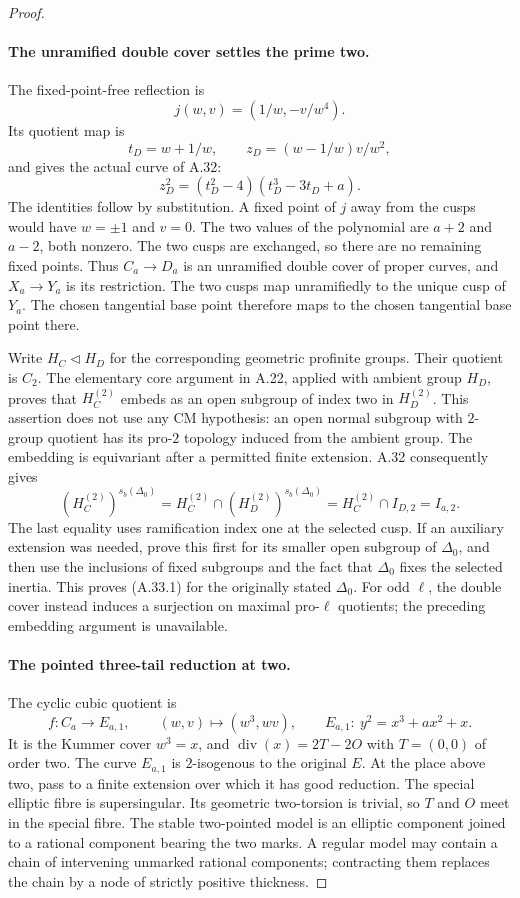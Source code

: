 \begin{proof}
\paragraph{The unramified double cover settles the prime two.}
The fixed-point-free reflection is
\[
 j(w,v)=(1/w,-v/w^4).
\]
Its quotient map is
\[
 t_D=w+1/w,\qquad
 z_D=(w-1/w)v/w^2,
\]
and gives the actual curve of A.32:
\[
 z_D^2=(t_D^2-4)(t_D^3-3t_D+a).
\]
The identities follow by substitution. A fixed point
of $j$ away from the cusps would have $w=\pm1$ and
$v=0$. The two values of the polynomial are $a+2$
and $a-2$, both nonzero. The two cusps are exchanged,
so there are no remaining fixed points. Thus
$C_a\to D_a$ is an unramified double cover of proper
curves, and $X_a\to Y_a$ is its restriction.
The two cusps map unramifiedly to the unique cusp
of $Y_a$. The chosen tangential base point therefore
maps to the chosen tangential base point there.

Write $H_C\triangleleft H_D$ for the corresponding
geometric profinite groups. Their quotient is $C_2$.
The elementary core argument in A.22, applied with
ambient group $H_D$, proves that $H_C^{(2)}$ embeds
as an open subgroup of index two in $H_D^{(2)}$.
This assertion does not use any CM hypothesis:
an open normal subgroup with $2$-group quotient has
its pro-$2$ topology induced from the ambient group.
The embedding is equivariant after a permitted
finite extension. A.32 consequently gives
\[
 (H_C^{(2)})^{s_b(\Delta_0)}
       =H_C^{(2)}\cap (H_D^{(2)})^{s_b(\Delta_0)}
       =H_C^{(2)}\cap I_{D,2}=I_{a,2}.
\]
The last equality uses ramification index one at
the selected cusp. If an auxiliary extension was
needed, prove this first for its smaller open
subgroup of $\Delta_0$, and then use the inclusions
of fixed subgroups and the fact that $\Delta_0$
fixes the selected inertia. This proves (A.33.1)
for the originally stated $\Delta_0$.
For odd $\ell$, the double cover instead induces
a surjection on maximal pro-$\ell$ quotients;
the preceding embedding argument is unavailable.

\paragraph{The pointed three-tail reduction at two.}
The cyclic cubic quotient is
\[
 f:C_a\longrightarrow E_{a,1},\qquad
          (w,v)\longmapsto(w^3,wv),
 \qquad E_{a,1}:\ y^2=x^3+ax^2+x.
\]
It is the Kummer cover $w^3=x$, and
$\operatorname{div}(x)=2T-2O$ with $T=(0,0)$
of order two. The curve $E_{a,1}$ is $2$-isogenous
to the original $E$. At the place above two,
pass to a finite extension over which it has good
reduction. The special elliptic fibre is
supersingular. Its geometric two-torsion is
trivial, so $T$ and $O$ meet in the special fibre.
The stable two-pointed model is an elliptic
component joined to a rational component bearing
the two marks. A regular model may contain a
chain of intervening unmarked rational components;
contracting them replaces the chain by a node
of strictly positive thickness.


\end{proof}
